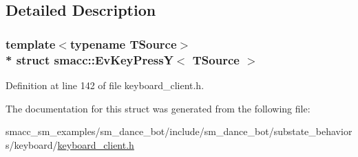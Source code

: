\subsection{Detailed Description}
\subsubsection*{template$<$typename T\+Source$>$\\*
struct smacc\+::\+Ev\+Key\+Press\+Y$<$ T\+Source $>$}



Definition at line 142 of file keyboard\+\_\+client.\+h.



The documentation for this struct was generated from the following file\+:\begin{DoxyCompactItemize}
\item 
smacc\+\_\+sm\+\_\+examples/sm\+\_\+dance\+\_\+bot/include/sm\+\_\+dance\+\_\+bot/substate\+\_\+behaviors/keyboard/\hyperlink{keyboard__client_8h}{keyboard\+\_\+client.\+h}\end{DoxyCompactItemize}
